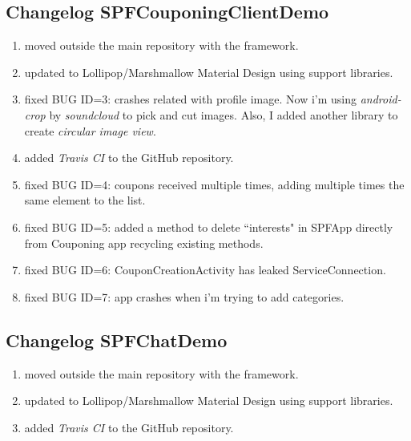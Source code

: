 \subsection*{Changelog SPFCouponingClientDemo}
\begin{enumerate}
	\item moved outside the main repository with the framework.
	\item updated to Lollipop/Marshmallow Material Design using support libraries.
	\item fixed BUG ID=3: crashes related with profile image. Now i'm using \emph{android-crop} by \emph{soundcloud} to pick and cut images. Also, I added another library to create \emph{circular image view}.	
	\item added \emph{Travis CI} to the GitHub repository.
	\item fixed BUG ID=4: coupons received multiple times, adding multiple times the same element to the list.
	\item fixed BUG ID=5: added a method to delete ``interests" in \textsf{SPFApp} directly from Couponing app recycling existing methods.
	\item fixed BUG ID=6: \textsf{CouponCreationActivity} has leaked \textsf{ServiceConnection}.
	\item fixed BUG ID=7: app crashes when i'm trying to add categories.
\end{enumerate}

\subsection*{Changelog SPFChatDemo}
\begin{enumerate}
	\item moved outside the main repository with the framework.
	\item updated to Lollipop/Marshmallow Material Design using support libraries.	
	\item added \emph{Travis CI} to the GitHub repository.
\end{enumerate}
